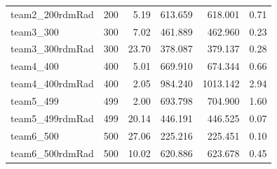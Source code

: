 \documentclass[11pt]{article}
\begin{document}
\begin{longtable}{lrrrrr}
team2\_200rdmRad & 200 & 5.19 & 613.659 & 618.001 & 0.71 \\
team3\_300 & 300 & 7.02 & 461.889 & 462.960 & 0.23 \\
team3\_300rdmRad & 300 & 23.70 & 378.087 & 379.137 & 0.28 \\
team4\_400 & 400 & 5.01 & 669.910 & 674.344 & 0.66 \\
team4\_400rdmRad & 400 & 2.05 & 984.240 & 1013.142 & 2.94 \\
team5\_499 & 499 & 2.00 & 693.798 & 704.900 & 1.60 \\
team5\_499rdmRad & 499 & 20.14 & 446.191 & 446.525 & 0.07 \\
team6\_500 & 500 & 27.06 & 225.216 & 225.451 & 0.10 \\
team6\_500rdmRad & 500 & 10.02 & 620.886 & 623.678 & 0.45 \\
\end{longtable}
\end{document}
